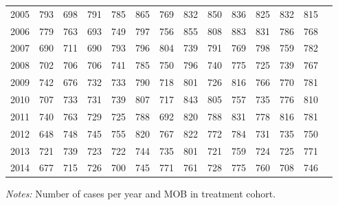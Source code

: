 \begin{table}[H]
\begin{threeparttable}
{\begin{tabular}{l*{13}{c}}
2005        &         793&         698&         791&         785&         865&         769&         832&         850&         836&         825&         832&         815\\
2006        &         779&         763&         693&         749&         797&         756&         855&         808&         883&         831&         786&         768\\
2007        &         690&         711&         690&         793&         796&         804&         739&         791&         769&         798&         759&         782\\
2008        &         702&         706&         706&         741&         785&         750&         796&         740&         775&         725&         739&         767\\
2009        &         742&         676&         732&         733&         790&         718&         801&         726&         816&         766&         770&         781\\
2010        &         707&         733&         731&         739&         807&         717&         843&         805&         757&         735&         776&         810\\
2011        &         740&         763&         729&         725&         788&         692&         820&         788&         831&         778&         816&         781\\
2012        &         648&         748&         745&         755&         820&         767&         822&         772&         784&         731&         735&         750\\
2013        &         721&         739&         723&         722&         744&         735&         801&         721&         759&         724&         725&         771\\
2014        &         677&         715&         726&         700&         745&         771&         761&         728&         775&         760&         708&         746\\
 \bottomrule \end{tabular} } \begin{tablenotes} \item \scriptsize \emph{Notes:} Number of cases per year and MOB in treatment cohort. \end{tablenotes} \end{threeparttable} \end{table} 
